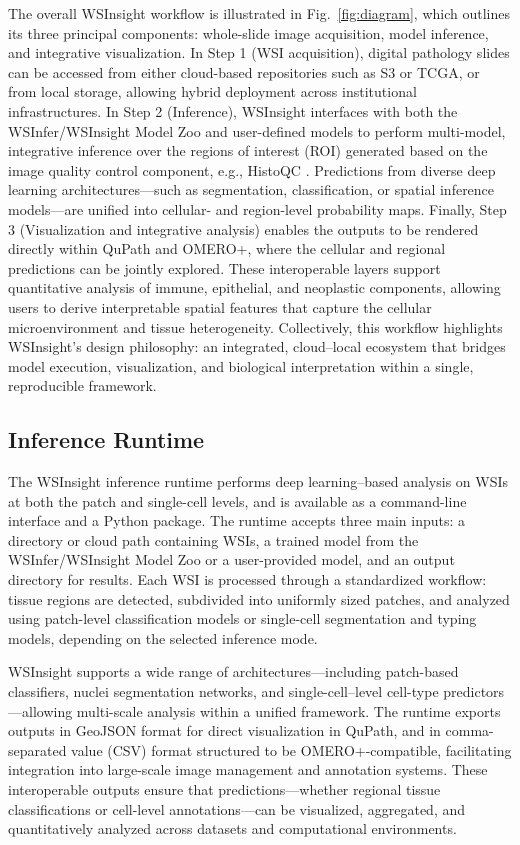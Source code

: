 \documentclass[sn-mathphys-num]{sn-jnl}%
\theoremstyle{thmstyleone}%
\theoremstyle{thmstyletwo}%
\theoremstyle{thmstylethree}%
\begin{document}
	The overall WSInsight workflow is illustrated in Fig.~\ref{fig:diagram}, which outlines its three principal components: whole-slide image acquisition, model inference, and integrative visualization. In Step 1 (WSI acquisition), digital pathology slides can be accessed from either cloud-based repositories such as S3 or TCGA, or from local storage, allowing hybrid deployment across institutional infrastructures. In Step 2 (Inference), WSInsight interfaces with both the WSInfer/WSInsight Model Zoo and user-defined models to perform multi-model, integrative inference over the regions of interest (ROI) generated based on the image quality control component, e.g., HistoQC \cite{Janowczyk:2019}. Predictions from diverse deep learning architectures—such as segmentation, classification, or spatial inference models—are unified into cellular- and region-level probability maps. Finally, Step 3 (Visualization and integrative analysis) enables the outputs to be rendered directly within QuPath and OMERO+, where the cellular and regional predictions can be jointly explored. These interoperable layers support quantitative analysis of immune, epithelial, and neoplastic components, allowing users to derive interpretable spatial features that capture the cellular microenvironment and tissue heterogeneity. Collectively, this workflow highlights WSInsight’s design philosophy: an integrated, cloud–local ecosystem that bridges model execution, visualization, and biological interpretation within a single, reproducible framework.
	
	\subsection{Inference Runtime}
	
	The WSInsight inference runtime performs deep learning–based analysis on WSIs at both the patch and single-cell levels, and is available as a command-line interface and a Python package. The runtime accepts three main inputs: a directory or cloud path containing WSIs, a trained model from the WSInfer/WSInsight Model Zoo or a user-provided model, and an output directory for results. Each WSI is processed through a standardized workflow: tissue regions are detected, subdivided into uniformly sized patches, and analyzed using patch-level classification models or single-cell segmentation and typing models, depending on the selected inference mode.
	
	WSInsight supports a wide range of architectures—including patch-based classifiers, nuclei segmentation networks, and single-cell–level cell-type predictors—allowing multi-scale analysis within a unified framework. 
	The runtime exports outputs in GeoJSON format for direct visualization in QuPath, and in comma-separated value (CSV) format structured to be OMERO+-compatible, facilitating integration into large-scale image management and annotation systems. These interoperable outputs ensure that predictions—whether regional tissue classifications or cell-level annotations—can be visualized, aggregated, and quantitatively analyzed across datasets and computational environments.
	
\end{document}
